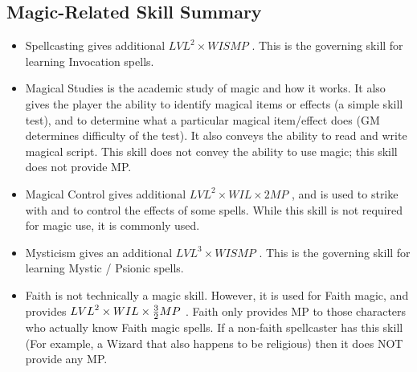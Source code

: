\documentclass[twoside]{book}
\begin{document}
    

\subsection{Magic-Related Skill Summary}
    
\begin{itemize}
      
  \item   Spellcasting gives additional \begin{math}    
                    {LVL}^{ 2 }   \times  WISMP
                         \end{math} . This is the governing skill
                      for learning Invocation spells.
              
  \item   Magical Studies is the academic study of magic
                 and how it works. It also gives the player the ability
                 to identify magical items or effects (a simple skill
                 test), and to determine what a particular magical
                 item/effect does (GM determines difficulty of the test).
                 It also conveys the ability to read and write magical
                 script. This skill does not convey the ability to use
                 magic; this skill does not provide MP. 
  \item   Magical Control gives additional \begin{math}    
                    {LVL}^{ 2 }   \times    WIL  
                      \times     2   MP  
                       \end{math} , and is used to strike with and to control
                      the effects of some spells. While this skill is not
                      required for magic use, it is commonly used.
              
  \item   Mysticism gives an additional \begin{math}    
                    {LVL}^{ 3 }   \times    WIS  MP
                         \end{math} . This is the governing skill
                      for learning Mystic / Psionic spells.
              
  \item   Faith is not technically a magic skill. However,
                 it is used for Faith magic, and provides \begin{math}  
                    {LVL}^{ 2 }   \times    WIL  
                      \times    {{ 3 }\over{ 2
                      }}  MP    \end{math} . Faith
                      only provides MP to those characters who actually
                      know Faith magic spells. If a non-faith spellcaster
                      has this skill (For example, a Wizard that also
                      happens to be religious) then it does NOT provide
                      any MP.
              

\end{itemize}
\end{document}
